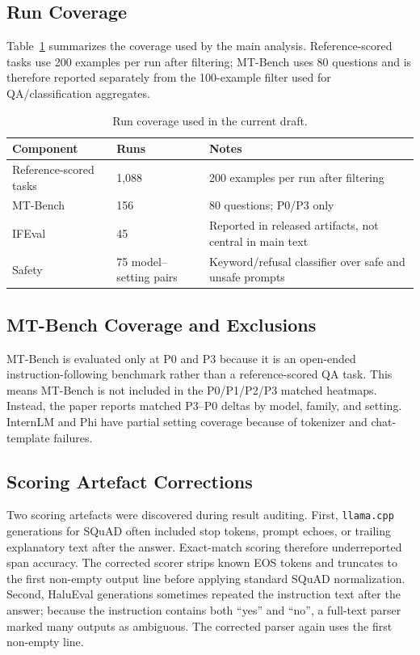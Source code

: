 \documentclass[letterpaper]{article}
\begin{document}
\subsection{Run Coverage}

Table~\ref{tab:app_coverage} summarizes the coverage used by the main analysis.
Reference-scored tasks use 200 examples per run after filtering; MT-Bench uses
80 questions and is therefore reported separately from the 100-example filter
used for QA/classification aggregates.

\begin{table}[t]
  \small\centering
  \caption{Run coverage used in the current draft.}
  \label{tab:app_coverage}
  \begin{tabular}{@{}lp{3.0cm}p{8.0cm}@{}}
    \toprule
    Component & Runs & Notes \\
    \midrule
    Reference-scored tasks & 1,088 & 200 examples per run after filtering \\
    MT-Bench & 156 & 80 questions; P0/P3 only \\
    IFEval~\cite{ifeval2023} & 45 & Reported in released artifacts, not central in main text \\
    Safety & 75 model--setting pairs & Keyword/refusal classifier over safe and unsafe prompts \\
    \bottomrule
  \end{tabular}
\end{table}

\subsection{MT-Bench Coverage and Exclusions}

MT-Bench is evaluated only at P0 and P3 because it is an open-ended
instruction-following benchmark rather than a reference-scored QA task. This
means MT-Bench is not included in the P0/P1/P2/P3 matched heatmaps. Instead,
the paper reports matched P3--P0 deltas by model, family, and setting.
InternLM and Phi have partial setting coverage because of tokenizer and
chat-template failures.



\subsection{Scoring Artefact Corrections}

Two scoring artefacts were discovered during result auditing. First,
\texttt{llama.cpp} generations for SQuAD often included stop tokens, prompt
echoes, or trailing explanatory text after the answer. Exact-match scoring
therefore underreported span accuracy. The corrected scorer strips known EOS
tokens and truncates to the first non-empty output line before applying standard
SQuAD normalization. Second, HaluEval generations sometimes repeated the
instruction text after the answer; because the instruction contains both
``yes'' and ``no'', a full-text parser marked many outputs as ambiguous. The
corrected parser again uses the first non-empty line.
\end{document}
